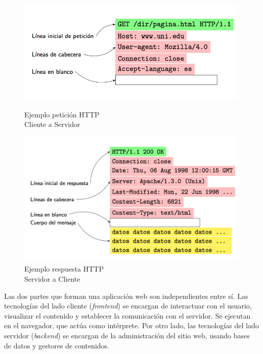 \begin{figure}[H]
\centering
\begin{minipage}[t]{.45\linewidth}
\centering
\includegraphics[width=1\columnwidth]{chapters/images/peticionhttp.png}
\caption{Ejemplo petición HTTP\\ Cliente a Servidor}
\end{minipage}
\hspace{0.25in}
\begin{minipage}[t]{.45\linewidth}
\centering
\includegraphics[width=1\columnwidth]{chapters/images/respuestahttp.png}
\caption{Ejemplo respuesta HTTP\\ Servidor a Cliente}
\end{minipage}
\end{figure}


Las dos partes que forman una aplicación web son independientes entre sí. Las tecnologías del  lado cliente (\textit{frontend}) se encargan de  interactuar con el usuario, visualizar el contenido y establecer la comunicación con el servidor. Se ejecutan en el navegador, que actúa como intérprete. Por otro lado, las tecnologías del lado servidor (\textit{backend}) se encargan de la administración del sitio web, usando bases de datos y gestores de contenidos.

